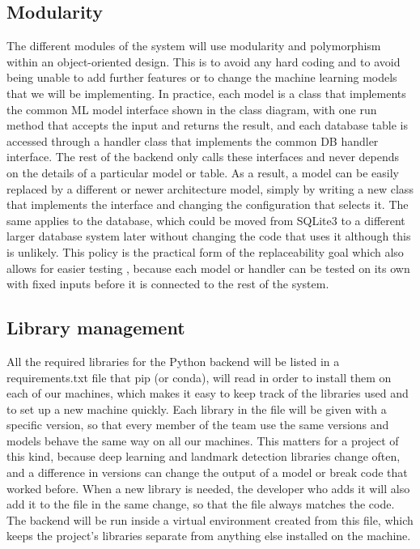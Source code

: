 \documentclass{FastFyp}
\begin{document}
\subsection{Modularity}
The different modules of the system will use modularity and polymorphism within an object-oriented design. This is to avoid any hard coding and to avoid being unable to add further features or to change the machine learning models that we will be implementing. In practice, each model is a class that implements the common ML model interface shown in the class diagram, with one run method that accepts the input and returns the result, and each database table is accessed through a handler class that implements the common DB handler interface. 
The rest of the backend only calls these interfaces and never depends on the details of a particular model or table. As a result, a model can be easily replaced by a different or newer architecture model, simply by writing a new class that implements the interface and changing the configuration that selects it. The same applies to the database, which could be moved from SQLite3 to a different larger database system later without changing the code that uses it although this is unlikely. This policy is the practical form of the replaceability goal which also allows for easier testing , because each model or handler can be tested on its own with fixed inputs before it is connected to the rest of the system.

\subsection{Library management}
All the required libraries for the Python backend will be listed in a requirements.txt file that pip (or conda), will read in order to install them on each of our machines, which makes it easy to keep track of the libraries used and to set up a new machine quickly. Each library in the file will be given with a specific version, so that every member of the team use the same versions and models behave the same way on all our machines. This matters for a project of this kind, because deep learning and landmark detection libraries change often, and a difference in versions can change the output of a model or break code that worked before. When a new library is needed, the developer who adds it will also add it to the file in the same change, so that the file always matches the code. The backend will be run inside a virtual environment created from this file, which keeps the project's libraries separate from anything else installed on the machine.
\end{document}
